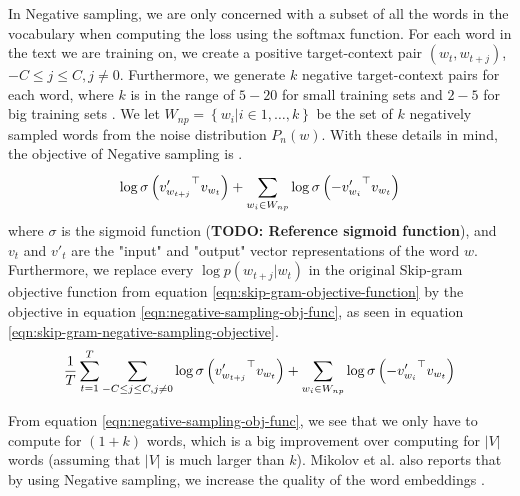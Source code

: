 \noindent
In Negative sampling, we are only concerned with a subset of all the words in the vocabulary when computing the loss using the softmax function. For each word in the text we are training on, we create a positive target-context pair $\left( w_t, w_{t+j} \right)$, $-C \leq j \leq C, j \neq 0$. Furthermore, we generate $k$ negative target-context pairs for each word, where $k$ is in the range of $5-20$ for small training sets and $2-5$ for big training sets \cite{mikolov2013b}. We let $W_{np} = \left \{ w_i | i \in 1, \ldots, k \right \}$ be the set of $k$ negatively sampled words from the noise distribution $P_n(w)$. With these details in mind, the objective of Negative sampling is \cite{mikolov2013b, rong2014word2vec}.
\begin{align}
    \log \sigma \left( {v'_{w_{t+j}}}^\top v_{w_t} \right) + \sum\limits_{w_i \in W_{np}}^{} \log \sigma \left( -{v'_{w_i}}^\top v_{w_t} \right)
    \label{eqn:negative-sampling-obj-func}
\end{align}
where $\sigma$ is the sigmoid function (\textbf{TODO: Reference sigmoid function}), and $v_t$ and $v'_t$ are the "input" and "output" vector representations of the word $w$. Furthermore, we replace every $\log p(w_{t+j} | w_t)$ in the original Skip-gram objective function from equation \ref{eqn:skip-gram-objective-function} by the objective in equation \ref{eqn:negative-sampling-obj-func}, as seen in equation \ref{eqn:skip-gram-negative-sampling-objective}.
\begin{align}
    \frac{1}{T} \sum\limits_{t=1}^{T} \sum\limits_{-C \leq j \leq C, j \neq 0}^{} \log \sigma \left( {v'_{w_{t+j}}}^\top v_{w_t} \right) + \sum\limits_{w_i \in W_{np}}^{} \log \sigma \left( -{v'_{w_i}}^\top v_{w_t} \right)
    \label{eqn:skip-gram-negative-sampling-objective}
\end{align}

\noindent
From equation \ref{eqn:negative-sampling-obj-func}, we see that we only have to compute for $(1 + k)$ words, which is a big improvement over computing for $|V|$ words (assuming that $|V|$ is much larger than $k$). Mikolov et al. also reports that by using Negative sampling, we increase the quality of the word embeddings \cite{mikolov2013b}.

